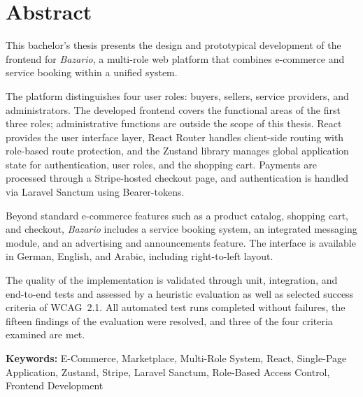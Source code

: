 \chapter*{Abstract}

This bachelor's thesis presents the design and prototypical
development of the frontend for \textit{Bazario}, a
multi-role web platform that combines e-commerce and service
booking within a unified system.

The platform distinguishes four user roles: buyers, sellers, service
providers, and administrators. The developed frontend covers the
functional areas of the first three roles; administrative functions
are outside the scope of this thesis. React provides the user
interface layer, React Router handles client-side routing with
role-based route protection, and the Zustand library manages global
application state for authentication, user roles, and the shopping
cart. Payments are processed through a Stripe-hosted checkout page,
and authentication is handled via Laravel Sanctum using
Bearer-tokens.

Beyond standard e-commerce features such as a product catalog,
shopping cart, and checkout, \textit{Bazario} includes a
service booking system, an integrated messaging module, and
an advertising and announcements feature. The interface is available
in German, English, and Arabic, including right-to-left layout.

The quality of the implementation is validated through unit,
integration, and end-to-end tests and assessed by a heuristic
evaluation as well as selected success criteria of WCAG~2.1. All
automated test runs completed without failures, the fifteen findings
of the evaluation were resolved, and three of the four criteria
examined are met.

\textbf{Keywords:} E-Commerce, Marketplace, Multi-Role
System, React, Single-Page Application, Zustand, Stripe,
Laravel Sanctum, Role-Based Access Control,
Frontend Development